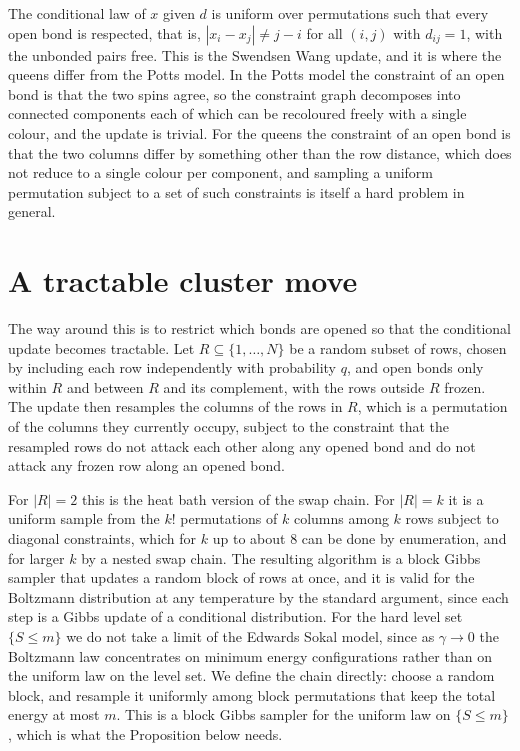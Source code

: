 The conditional law of $x$ given $d$ is uniform over permutations such that every open bond is respected, that is, $|x_i - x_j| \ne j - i$ for all $(i, j)$ with $d_{ij} = 1$, with the unbonded pairs free. This is the Swendsen Wang update, and it is where the queens differ from the Potts model. In the Potts model the constraint of an open bond is that the two spins agree, so the constraint graph decomposes into connected components each of which can be recoloured freely with a single colour, and the update is trivial. For the queens the constraint of an open bond is that the two columns differ by something other than the row distance, which does not reduce to a single colour per component, and sampling a uniform permutation subject to a set of such constraints is itself a hard problem in general.

\section{A tractable cluster move}

The way around this is to restrict which bonds are opened so that the conditional update becomes tractable. Let $R \subseteq \{1, \dots, N\}$ be a random subset of rows, chosen by including each row independently with probability $q$, and open bonds only within $R$ and between $R$ and its complement, with the rows outside $R$ frozen. The update then resamples the columns of the rows in $R$, which is a permutation of the columns they currently occupy, subject to the constraint that the resampled rows do not attack each other along any opened bond and do not attack any frozen row along an opened bond.

For $|R| = 2$ this is the heat bath version of the swap chain. For $|R| = k$ it is a uniform sample from the $k!$ permutations of $k$ columns among $k$ rows subject to diagonal constraints, which for $k$ up to about $8$ can be done by enumeration, and for larger $k$ by a nested swap chain. The resulting algorithm is a block Gibbs sampler that updates a random block of rows at once, and it is valid for the Boltzmann distribution at any temperature by the standard argument, since each step is a Gibbs update of a conditional distribution. For the hard level set $\{ S \le m \}$ we do not take a limit of the Edwards Sokal model, since as $\gamma \to 0$ the Boltzmann law concentrates on minimum energy configurations rather than on the uniform law on the level set. We define the chain directly: choose a random block, and resample it uniformly among block permutations that keep the total energy at most $m$. This is a block Gibbs sampler for the uniform law on $\{ S \le m \}$, which is what the Proposition below needs.

